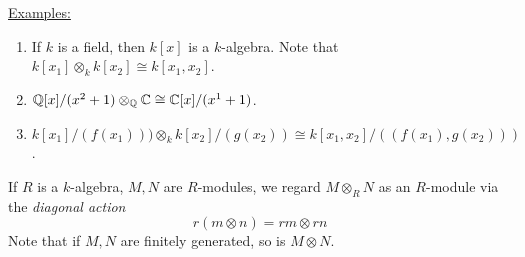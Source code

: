 \documentclass[10pt,a4paper]{article}
\begin{document}
\underline{Examples:}
\begin{enumerate}
  \item If $k$ is a field, then $k[x]$ is a $k$-algebra. Note that $k[x_1]\otimes_k k[x_2] \cong k[x_1,x_2]$.
  \item $\mathbb{Q}[x]/(x^2+1) \otimes_{\mathbb{Q}} \mathbb{C} \cong \mathbb{C}[x]/(x^1+1)$.
  \item $k[x_1]/(f(x_1))) \otimes_k k[x_2]/(g(x_2)) \cong k[x_1,x_2]/((f(x_1), g(x_2)))$.
\end{enumerate}

\begin{definition}
  If $R$ is a $k$-algebra, $M, N$ are $R$-modules, we regard $M \otimes_R N$ as an $R$-module via the \emph{diagonal action}
  \[r(m\otimes n) = rm\otimes rn\]
  Note that if $M, N$ are finitely generated, so is $M\otimes N$.
\end{definition}
\end{document}
